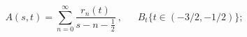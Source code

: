 \begin{equation}
A(s,t)=\sum_{n=0}^\infty \frac{r_n(t)}{s-n-\frac{1}{2}}\ ,
\ \ \ \ \ \ \ B_t \{ t \in (-3/2,-1/2) \} ;
\label{a2}
\end{equation}

